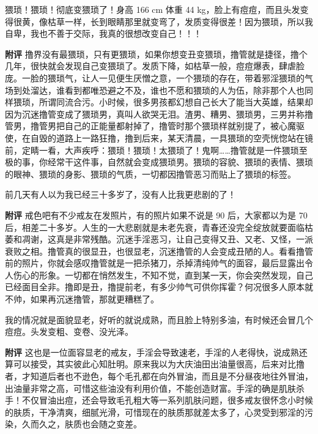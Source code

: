 \begin{case}[变丑]
    猥琐！猥琐！彻底变猥琐了！身高 166 \unit{\cm} 体重 44 \unit{\kg}，脸上有痘痘，而且头发变得很黄，像枯草一样，长到眼睛那里就变弯了，发质变得很差！因为猥琐，所以我自卑，我也不善于交际，我真的很想改变自己！！！

    \textbf{附评} 撸界没有最猥琐，只有更猥琐，如果你想变丑变猥琐，撸管就是捷径，撸个几年，很快就会发现自己变猥琐了。发质下降，如枯草一般，痘痘爆表，肆虐脸庞。一脸的猥琐气，让人一见便生厌憎之意，一个猥琐的存在，带着邪淫猥琐的气场到处溜达，谁看到都唯恐避之不及，谁也不愿和猥琐的人为伍，除非那个人也同样猥琐，所谓同流合污。小时候，很多男孩都幻想自己长大了能当大英雄，结果却因为沉迷撸管变成了猥琐男，真叫人欲哭无泪。渣男、糟男、猥琐男，三男并称撸管男，撸管男把自己的正能量都射掉了，撸管时那个猥琐样就别提了，被心魔驱使，在自毁的道路上一路狂撸，撸到后来，某天清晨，一具猥琐的空壳恍惚站在镜前，定睛一看，大声疾呼：猥琐！猥琐！太猥琐了！鬼啊……撸管就是一件猥琐至极的事，你经常干这件事，自然就会变成猥琐男。猥琐的容貌、猥琐的表情、猥琐的眼神、猥琐的身影、猥琐的气质，一切都因撸管恶习而贴上了猥琐的标签。
\end{case}

\begin{case}[变丑]
    前几天有人以为我已经三十多岁了，没有人比我更悲剧的了！

    \textbf{附评} 戒色吧有不少戒友在发照片，有的照片如果不说是 90 后，大家都以为是 70 后，相差二十多岁。人生的一大悲剧就是未老先衰，青春还没完全绽放就要面临枯萎和凋谢，这真是非常残酷。沉迷手淫恶习，让自己变得又丑、又老、又怪，一派衰败之相。撸管真的很显丑，也很显老，沉迷撸管的人会变成丑陋的人。看看撸管前的照片，你就会感叹撸管就是一把杀猪刀，杀掉清纯帅气的面容，最后显露出令人伤心的形象。一切都在悄然发生，不知不觉，直到某一天，你会突然发现，自己已经面目全非。撸即是丑，撸提前老，有多少帅气可供你挥霍？何况很多人原本就不帅，如果再沉迷撸管，那就更糟糕了。
\end{case}

\begin{case}[变丑]
    我的情况就是面貌显老，好听的就说成熟，而且脸上特别多油，有时候还会冒几个痘痘。头发变粗、变卷、没光泽。

    \textbf{附评} 这也是一位面容显老的戒友，手淫会导致速老，手淫的人老得快，说成熟还算可以接受，其实彼此心知肚明。原来我以为大庆油田出油量很高，后来对比撸者，才知道后者也不逊色，每个毛孔都在向外冒油，而且是不分昼夜地往外冒油，出油量非常之高，可惜这些油没有利用价值，不能创造财富。手淫的确是肌肤杀手！不仅冒油出痘，还会导致毛孔粗大等一系列肌肤问题，很多戒友很怀念小时候的肤质，干净清爽，细腻光滑，可惜现在的肤质那就差太多了，心灵受到邪淫的污染，久而久之，肤质也会随之变差。
\end{case}

